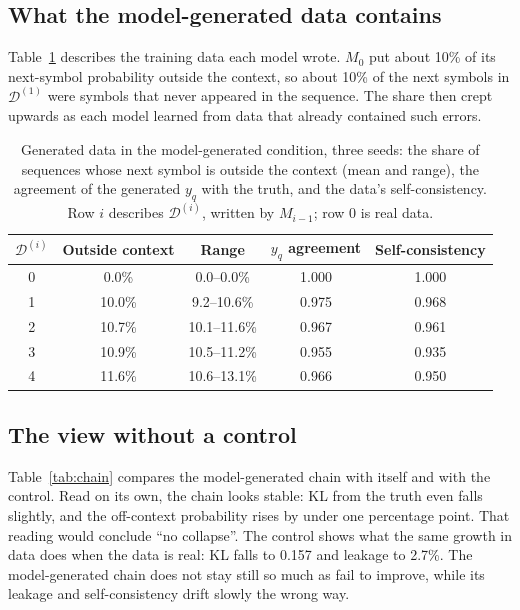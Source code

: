 \documentclass[11pt,a4paper]{article}
\newcommand{\yq}{y_{q}}
\newcommand{\data}[1]{\mathcal{D}^{(#1)}}
\begin{document}
\subsection{What the model-generated data contains}
Table~\ref{tab:data} describes the training data each model wrote. $M_0$ put
about 10\% of its next-symbol probability outside the context, so about 10\%
of the next symbols in $\data{1}$ were symbols that never appeared in the
sequence. The share then crept upwards as each model learned from data that
already contained such errors.

\begin{table}[htbp]
\centering
\small
\caption{Generated data in the model-generated condition, three seeds: the
share of sequences whose next symbol is outside the context (mean and range),
the agreement of the generated $\yq$ with the truth, and the data's
self-consistency. Row $i$ describes $\data{i}$, written by $M_{i-1}$; row 0 is
real data.}
\label{tab:data}
\begin{tabular}{ccccc}
\toprule
$\data{i}$ & Outside context & Range & $\yq$ agreement & Self-consistency\\
\midrule
0 & 0.0\% & 0.0--0.0\% & 1.000 & 1.000 \\
1 & 10.0\% & 9.2--10.6\% & 0.975 & 0.968 \\
2 & 10.7\% & 10.1--11.6\% & 0.967 & 0.961 \\
3 & 10.9\% & 10.5--11.2\% & 0.955 & 0.935 \\
4 & 11.6\% & 10.6--13.1\% & 0.966 & 0.950 \\
\bottomrule
\end{tabular}
\end{table}

\subsection{The view without a control}
Table~\ref{tab:chain} compares the model-generated chain with itself and with
the control. Read on its own, the chain looks stable: KL from the truth even
falls slightly, and the off-context probability rises by under one percentage
point. That reading would conclude ``no collapse''. The control shows what the
same growth in data does when the data is real: KL falls to 0.157 and leakage
to 2.7\%. The model-generated chain does not stay still so much as fail to
improve, while its leakage and self-consistency drift slowly the wrong way.
\end{document}
